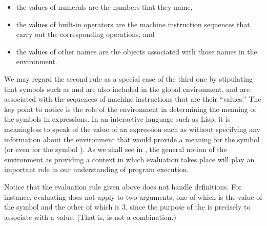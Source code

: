\begin{itemize}

\item
the values of numerals are the numbers that they name,

\item
the values of built-in operators are the machine instruction sequences that
carry out the corresponding operations, and

\item
the values of other names are the objects associated with those names in the
environment.

\end{itemize}

\noindent
We may regard the second rule as a special case of the third one by stipulating
that symbols such as \code{+} and \code{*} are also included in the global
environment, and are associated with the sequences of machine instructions that
are their ``values.''  The key point to notice is the role of the environment
in determining the meaning of the symbols in expressions.  In an interactive
language such as Lisp, it is meaningless to speak of the value of an expression
such as  without specifying any information about the environment
that would provide a meaning for the symbol  (or even for the symbol
\code{+}).  As we shall see in , the general notion of the
environment as providing a context in which evaluation takes place will play an
important role in our understanding of program execution.

Notice that the evaluation rule given above does not handle definitions.  For
instance, evaluating  does not apply  to two
arguments, one of which is the value of the symbol  and the other of
which is 3, since the purpose of the  is precisely to associate
 with a value.  (That is,  is not a combination.)

